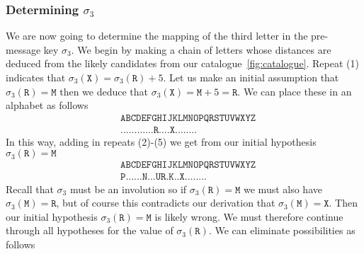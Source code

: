 \subsubsection{Determining $\sigma_3$}
We are now going to determine the mapping of the third letter in the pre-message key $\sigma_3$. We begin by making a chain of letters whose distances are deduced from the likely candidates from our catalogue~\ref{fig:catalogue}. Repeat (1) indicates that $\sigma_3(\texttt{X}) = \sigma_3(\texttt{R}) + 5$. Let us make an initial assumption that $\sigma_3(\texttt{R}) = \texttt{M}$ then we deduce that $\sigma_3(\texttt{X}) = \texttt{M} + 5 = \texttt{R}$. We can place these in an alphabet as follows
\begin{align*}
	 & \texttt{ABCDEFGHIJKLMNOPQRSTUVWXYZ} \\
	 & \texttt{............R....X........}
\end{align*}
In this way, adding in repeats (2)-(5) we get from our initial hypothesis $\sigma_3(\texttt{R}) = \texttt{M}$
\begin{align*}
	 & \texttt{ABCDEFGHIJKLMNOPQRSTUVWXYZ} \\
	 & \texttt{P......N...UR.K..X........}
\end{align*}
Recall that $\sigma_3$ must be an involution so if $\sigma_3(\texttt{R}) = \texttt{M}$ we must also have $\sigma_3(\texttt{M}) = \texttt{R}$, but of course this contradicts our derivation that $\sigma_3(\texttt{M}) = \texttt{X}$. Then our initial hypothesis $\sigma_3(\texttt{R}) = \texttt{M}$ is likely wrong. We must therefore continue through all hypotheses for the value of $\sigma_3(\texttt{R})$. We can eliminate possibilities as follows
